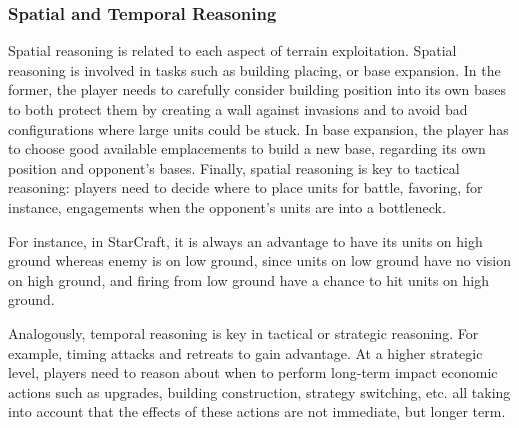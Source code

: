 \documentclass[journal]{IEEEtran}
\begin{document}
\subsubsection{Spatial and Temporal Reasoning}
Spatial  reasoning   is  related  to   each  aspect  of   terrain
exploitation.  Spatial reasoning is involved in tasks such as building placing, or base expansion. In the former, the player needs to
carefully  consider building  position  into its  own  bases to  both
protect them  by creating  a wall against  invasions and to  avoid bad
configurations  where large  units could  be stuck. In base expansion, the player has to
choose good available emplacements to  build a new base, regarding its
own  position  and opponent's  bases.  Finally,  spatial reasoning  is
key to tactical reasoning: players need to decide where to place units
for battle,  favoring, for  instance, engagements when  the opponent's
units are into a bottleneck. 

For instance, in StarCraft, it is always an advantage to  have its units  on high ground  whereas enemy is  on low ground, since units  on low ground have no vision  on high ground, and firing from low ground have a chance to  hit units on high ground.

Analogously, temporal reasoning is key in tactical or strategic reasoning. For example, timing attacks and retreats to gain advantage. At a higher strategic level, players need to reason about when to perform long-term impact economic actions such as upgrades, building construction, strategy switching, etc. all taking into account that the effects of these actions are not immediate, but longer term.
\end{document}
